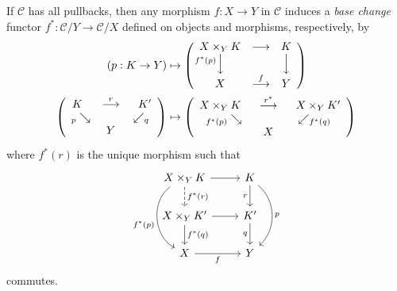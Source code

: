 \documentclass[10pt,letterpaper,cm]{nupset}
\theoremstyle{definition}
\theoremstyle{theorem}
\theoremstyle{remark}
\newcommand{\0}{\mathbf{0}}
\newcommand{\1}{\mathbf{1}}
\newcommand{\2}{\mathbf{2}}
\renewcommand{\c}{\mathscr{C}}
\begin{document}
If $\c$ has all pullbacks, then any morphism $f:X \to Y$ in $\c$ induces a \textit{base change} functor \linebreak $f^{\ast} : \c/Y \to \c/X$  defined on objects and morphisms, respectively, by 
\begin{align*}
\left(p : K \to Y\right)
 & \mapsto
  \left(
  \begin{array}{ccc}
    X \times_Y K &\longrightarrow & K
    \\
    {}^{\mathllap{f^{\ast}(p)}}\Big\downarrow && \Big\downarrow
    \\
    X &\overset{f}{\longrightarrow}& Y 
  \end{array}
  \right)
  \,
 \\  \left( 
     \begin{array}{ccc}
       K \ \ &\overset{r}{\longrightarrow} & \ \ K' \\
        {}_p \searrow & & \swarrow_{q}
       \\   
       & Y &
    \end{array}
  \right)   & \mapsto   \left( 
     \begin{array}{ccc}
        X \times_Y K \ \ &\overset{r^{\ast}}{\longrightarrow} & \ \  X \times_Y K' \\
        {}_{f^{\ast}(p)} \searrow & & \swarrow_{f^{\ast}(q)}
       \\   
       & X &
    \end{array}
  \right)
\end{align*}
 where $f^{\ast}(r)$ is the unique morphism such that
 \[
\begin{tikzcd}
X \times_Y K \arrow[r] \arrow[d, "f^{\ast}(r)", dashed] \arrow[dd, "f^{\ast}(p)"', bend right=59] & K \arrow[d, "r"'] \arrow[dd, "p", bend left=49] \\
X \times_Y K' \arrow[d, "f^{\ast}(q)"] \arrow[r]                                               & K' \arrow[d, "q"']                             \\
X \arrow[r, "f"']                                                                                    & Y                                             
\end{tikzcd}
 \]
 commutes.
\end{document}
